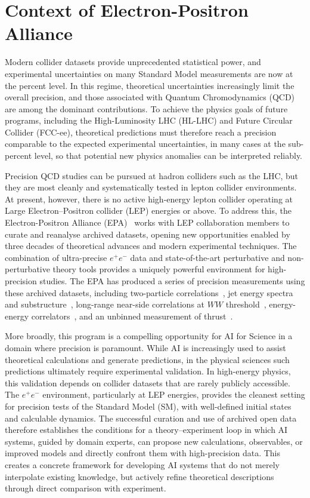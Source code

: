 \section{Context of Electron-Positron Alliance}
\label{sec:context}

Modern collider datasets provide unprecedented statistical power, and experimental uncertainties on many Standard Model measurements are now at the percent level. In this regime, theoretical uncertainties increasingly limit the overall precision, and those associated with Quantum Chromodynamics (QCD) are among the dominant contributions. To achieve the physics goals of future programs, including the High-Luminosity LHC (HL-LHC) and Future Circular Collider (FCC-ee), theoretical predictions must therefore reach a precision comparable to the expected experimental uncertainties, in many cases at the sub-percent level, so that potential new physics anomalies can be interpreted reliably.

Precision QCD studies can be pursued at hadron colliders such as the LHC, but they are most cleanly and systematically tested in lepton collider environments. At present, however, there is no active high-energy lepton collider operating at Large Electron--Positron collider (LEP) energies or above. To address this, the Electron-Positron Alliance (EPA)~\cite{EEAlliance:website} works with LEP collaboration members to curate and reanalyse archived datasets, opening new opportunities enabled by three decades of theoretical advances and modern experimental techniques. The combination of ultra-precise $e^+e^-$ data and state-of-the-art perturbative and non-perturbative theory tools provides a uniquely powerful environment for high-precision studies. The EPA has produced a series of precision measurements using these archived datasets, including two-particle correlations~\cite{Badea:2019vey}, jet energy spectra and substructure~\cite{Chen:2021uws}, long-range near-side correlations at $WW$ threshold~\cite{Chen:2024lrc}, energy-energy correlators~\cite{Bossi:2025eec}, and an unbinned measurement of thrust~\cite{Badea:2025ubt}.

More broadly, this program is a compelling opportunity for AI for Science in a domain where precision is paramount. While AI is increasingly used to assist theoretical calculations and generate predictions, in the physical sciences such predictions ultimately require experimental validation. In high-energy physics, this validation depends on collider datasets that are rarely publicly accessible. The $e^+e^-$ environment, particularly at LEP energies, provides the cleanest setting for precision tests of the Standard Model (SM), with well-defined initial states and calculable dynamics. The successful curation and use of archived open data therefore establishes the conditions for a theory--experiment loop in which AI systems, guided by domain experts, can propose new calculations, observables, or improved models and directly confront them with high-precision data. This creates a concrete framework for developing AI systems that do not merely interpolate existing knowledge, but actively refine theoretical descriptions through direct comparison with experiment.
